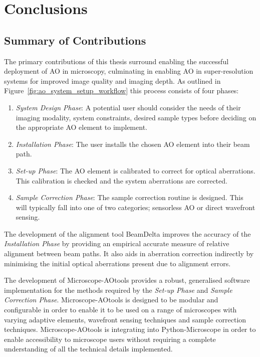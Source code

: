 \chapter{Conclusions}
\label{chpt:conclusions}

\section{Summary of Contributions}
\label{sec:contributions}

The primary contributions of this thesis surround enabling the successful 
deployment of AO in microscopy, culminating in enabling AO in 
super-resolution systems for improved image quality and imaging depth. As 
outlined in Figure~\ref{fig:ao_system_setup_workflow} this process consists 
of four phases:

\begin{enumerate}
	\item \textit{System Design Phase}: A potential user should consider 
	the needs of their imaging modality, system constraints, desired 
	sample types before deciding on the appropriate AO element to 
	implement.
	\item \textit{Installation Phase}: The user installs the chosen AO 
	element into their beam path.
	\item \textit{Set-up Phase}: The AO element is calibrated to correct 
	for optical aberrations. This calibration is checked and the system 
	aberrations are corrected.
	\item \textit{Sample Correction Phase}: The sample correction routine 
	is designed. This will typically fall into one of two categories; 
	sensorless AO or direct wavefront sensing.
\end{enumerate}  

The development of the alignment tool BeamDelta improves the accuracy of the 
\textit{Installation Phase} by providing an empirical accurate measure of 
relative alignment between beam paths\cite{dobbie2019beamdelta}. It also aids 
in aberration correction indirectly by minimising the initial optical 
aberrations present due to alignment errors.

The development of Microscope-AOtools provides a robust, generalised 
software implementation for the methods required by the \textit{Set-up Phase} 
and \textit{Sample Correction Phase}\cite{hall2020microscope}. 
Microscope-AOtools is designed to be modular and configurable in order to 
enable it to be used on a range of microscopes with varying adaptive 
elements, wavefront sensing techniques and sample correction techniques. 
Microscope-AOtools is integrating into Python-Microscope in order to enable 
accessibility to microscope users without requiring a complete understanding 
of all the technical details implemented.

